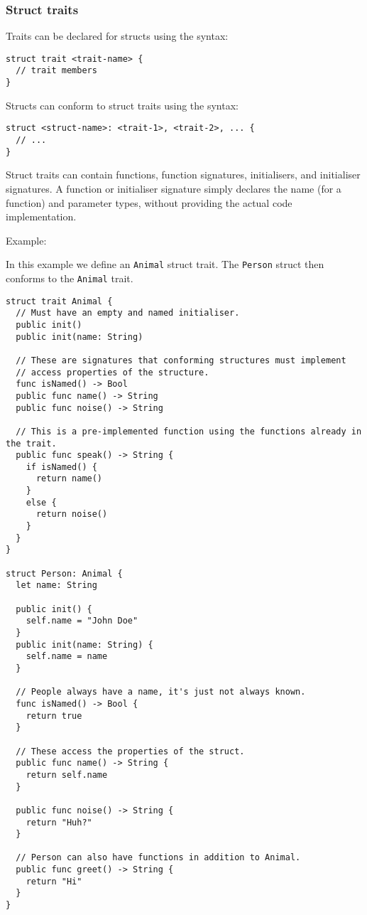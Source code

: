 \subsubsection{Struct traits}
\label{sec:appendix-b-struct-traits}

Traits can be declared for structs using the syntax:

\begin{verbatim}
struct trait <trait-name> {
  // trait members
}
\end{verbatim}

Structs can conform to struct traits using the syntax:

\begin{verbatim}
struct <struct-name>: <trait-1>, <trait-2>, ... {
  // ...
}
\end{verbatim}

Struct traits can contain functions, function signatures, initialisers, and initialiser signatures. A function or initialiser signature simply declares the name (for a function) and parameter types, without providing the actual code implementation.

Example:

In this example we define an \texttt{Animal} struct trait. The \texttt{Person} struct then conforms to the \texttt{Animal} trait.

\begin{verbatim}
struct trait Animal {
  // Must have an empty and named initialiser.
  public init()
  public init(name: String)

  // These are signatures that conforming structures must implement
  // access properties of the structure.
  func isNamed() -> Bool
  public func name() -> String
  public func noise() -> String

  // This is a pre-implemented function using the functions already in the trait.
  public func speak() -> String {
    if isNamed() {
      return name()
    }
    else {
      return noise()
    }
  }
}

struct Person: Animal {
  let name: String

  public init() {
    self.name = "John Doe"
  }
  public init(name: String) {
    self.name = name
  }

  // People always have a name, it's just not always known.
  func isNamed() -> Bool {
    return true
  }

  // These access the properties of the struct.
  public func name() -> String {
    return self.name
  }

  public func noise() -> String {
    return "Huh?"
  }

  // Person can also have functions in addition to Animal.
  public func greet() -> String {
    return "Hi"
  }
}
\end{verbatim}

